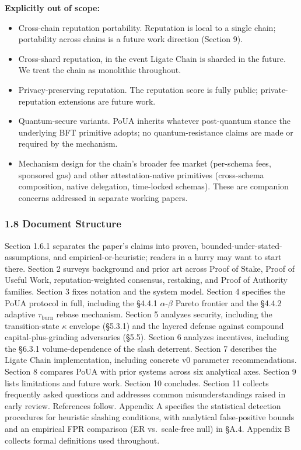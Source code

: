 \documentclass[
  11pt,
]{article}
\providecommand{\tightlist}{%
  \setlength{\itemsep}{0pt}\setlength{\parskip}{0pt}}
\begin{document}
\textbf{Explicitly out of scope:}

\begin{itemize}
\tightlist
\item
  Cross-chain reputation portability. Reputation is local to a single
  chain; portability across chains is a future work direction (Section
  9).
\item
  Cross-shard reputation, in the event Ligate Chain is sharded in the
  future. We treat the chain as monolithic throughout.
\item
  Privacy-preserving reputation. The reputation score is fully public;
  private-reputation extensions are future work.
\item
  Quantum-secure variants. PoUA inherits whatever post-quantum stance
  the underlying BFT primitive adopts; no quantum-resistance claims are
  made or required by the mechanism.
\item
  Mechanism design for the chain's broader fee market (per-schema fees,
  sponsored gas) and other attestation-native primitives (cross-schema
  composition, native delegation, time-locked schemas). These are
  companion concerns addressed in separate working papers.
\end{itemize}

\subsubsection{1.8 Document Structure}\label{document-structure}

Section 1.6.1 separates the paper's claims into proven,
bounded-under-stated-assumptions, and empirical-or-heuristic; readers in
a hurry may want to start there. Section 2 surveys background and prior
art across Proof of Stake, Proof of Useful Work, reputation-weighted
consensus, restaking, and Proof of Authority families. Section 3 fixes
notation and the system model. Section 4 specifies the PoUA protocol in
full, including the §4.4.1 \(\alpha\)-\(\beta\) Pareto frontier and the
§4.4.2 adaptive \(\tau_{\text{burn}}\) rebase mechanism. Section 5
analyzes security, including the transition-state \(\kappa\) envelope
(§5.3.1) and the layered defense against compound capital-plus-grinding
adversaries (§5.5). Section 6 analyzes incentives, including the §6.3.1
volume-dependence of the slash deterrent. Section 7 describes the Ligate
Chain implementation, including concrete v0 parameter recommendations.
Section 8 compares PoUA with prior systems across six analytical axes.
Section 9 lists limitations and future work. Section 10 concludes.
Section 11 collects frequently asked questions and addresses common
misunderstandings raised in early review. References follow. Appendix A
specifies the statistical detection procedures for heuristic slashing
conditions, with analytical false-positive bounds and an empirical FPR
comparison (ER vs.~scale-free null) in §A.4. Appendix B collects formal
definitions used throughout.
\end{document}
